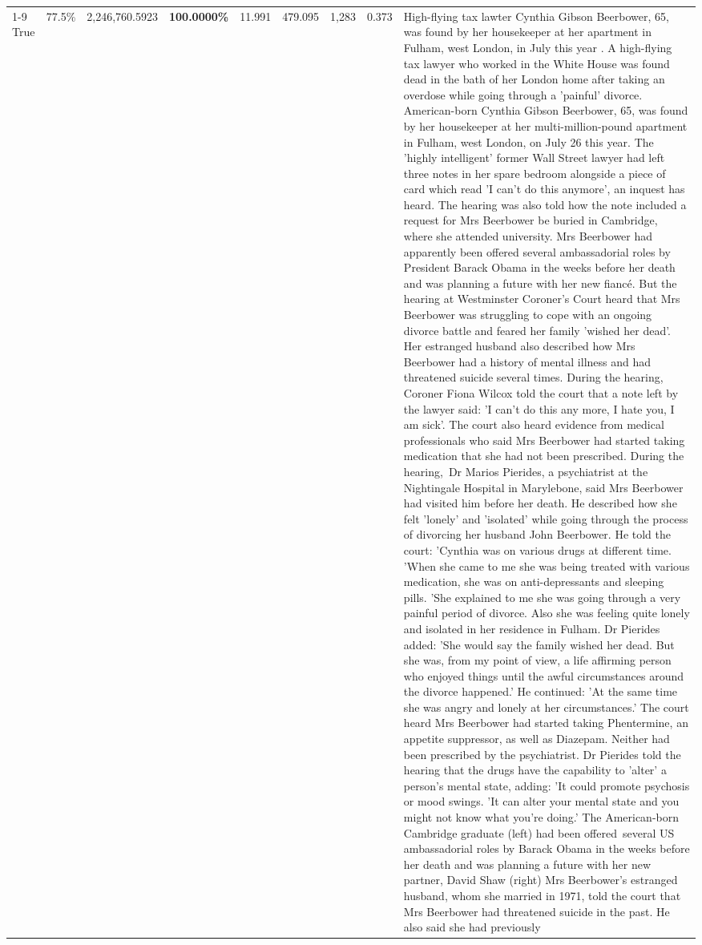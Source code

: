 \begin{table}[H]
\begin{tabular}{lllrlllll}
\cline{1-9}
True & 77.5\% & 2,246,760.5923 & \bfseries \color{red} 100.0000\% & 11.991 & 479.095 & 1,283 & 0.373 & High-flying tax lawter Cynthia Gibson Beerbower, 65, was found by her housekeeper at her apartment in Fulham, west London, in July this year . A high-flying tax lawyer who worked in the White House was found dead in the bath of her London home after taking an overdose while going through a 'painful' divorce. American-born Cynthia Gibson Beerbower, 65, was found by her housekeeper at her multi-million-pound apartment in Fulham, west London, on July 26 this year. The 'highly intelligent' former Wall Street lawyer had left three notes in her spare bedroom alongside a piece of card which read 'I can't do this anymore', an inquest has heard. The hearing was also told how the note included a request for Mrs Beerbower be buried in Cambridge, where she attended university. Mrs Beerbower had apparently been offered several ambassadorial roles by President Barack Obama in the weeks before her death and was planning a future with her new fiancé. But the hearing at Westminster Coroner's Court heard that Mrs Beerbower was struggling to cope with an ongoing divorce battle and feared her family 'wished her dead'. Her estranged husband also described how Mrs Beerbower had a history of mental illness and had threatened suicide several times. During the hearing, Coroner Fiona Wilcox told the court that a note left by the lawyer said: 'I can't do this any more, I hate you, I am sick'. The court also heard evidence from medical professionals who said Mrs Beerbower had started taking medication that she had not been prescribed. During the hearing, Dr Marios Pierides, a psychiatrist at the Nightingale Hospital in Marylebone, said Mrs Beerbower had visited him before her death. He described how she felt 'lonely' and 'isolated' while going through the process of divorcing her husband John Beerbower. He told the court: 'Cynthia was on various drugs at different time. 'When she came to me she was being treated with various medication, she was on anti-depressants and sleeping pills. 'She explained to me she was going through a very painful period of divorce. Also she was feeling quite lonely and isolated in her residence in Fulham. Dr Pierides added: 'She would say the family wished her dead. But she was, from my point of view, a life affirming person who enjoyed things until the awful circumstances around the divorce happened.' He continued: 'At the same time she was angry and lonely at her circumstances.' The court heard Mrs Beerbower had started taking Phentermine, an appetite suppressor, as well as Diazepam. Neither had been prescribed by the psychiatrist. Dr Pierides told the hearing that the drugs have the capability to 'alter' a person's mental state, adding: 'It could promote psychosis or mood swings. 'It can alter your mental state and you might not know what you're doing.' The American-born Cambridge graduate (left) had been offered several US ambassadorial roles by Barack Obama in the weeks before her death and was planning a future with her new partner, David Shaw (right) Mrs Beerbower's estranged husband, whom she married in 1971, told the court that Mrs Beerbower had threatened suicide in the past. He also said she had previously 
\end{tabular}
\end{table}

